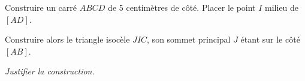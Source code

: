 Construire un carré $ABCD$ de 5 centimètres de côté. Placer le point $I$ milieu de $[AD]$.
\par Construire alors le triangle isocèle $JIC$, son sommet principal $J$ étant sur le côté $[AB]$.
\par{\em Justifier la construction.}